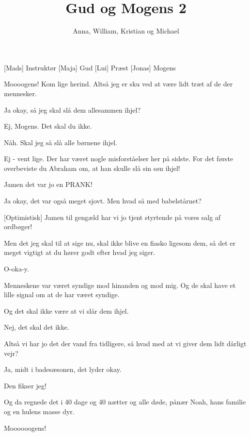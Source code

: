 \documentclass[a4paper,11pt]{article}
\title{Gud og Mogens 2}
\author{Anna, William, Kristian og Michael}
\begin{document}
\maketitle

\begin{roles}
[Mads] Instruktør
[Maja] Gud
[Lui] Præst
[Jonas] Mogens
\end{roles}


  
\begin{sketch}

 Moooogens! Kom lige herind. Altså jeg er sku ved at være lidt træt af de der mennesker.

 Ja okay, så jeg skal slå dem allesammen ihjel?

 Ej, Mogens. Det skal du ikke.

 Nåh. Skal jeg så slå alle børnene ihjel.

 Ej - vent lige. Der har været nogle misforståelser her på sidste. For det første overbeviste du Abraham om, at han skulle slå sin søn ihjel!

 Jamen det var jo en PRANK!

 Ja okay, det var også meget sjovt. Men hvad så med babelstårnet?

[Optimistisk] Jamen til gengæld har vi jo tjent styrtende på vores salg af ordbøger!

 Men det jeg skal til at sige nu, skal ikke blive en fiasko ligesom dem, så det er meget vigtigt at du hører godt efter hvad jeg siger.

 O-oka-y.

 Menneskene var været syndige mod hinanden og mod mig. Og de skal have et lille signal om at de har været syndige.

 Og det skal ikke være at vi slår dem ihjel.

 Nej, det skal det ikke.

 Altså vi har jo det der vand fra tidligere, så hvad med at vi giver dem lidt dårligt vejr?

 Ja, midt i badesæsonen, det lyder okay.

  Den fikser jeg! 

 Og da regnede det i 40 dage og 40 nætter og alle døde, pånær Noah, hans familie og en hulens masse dyr.

 Moooooogens!



\end{sketch}
\end{document}
